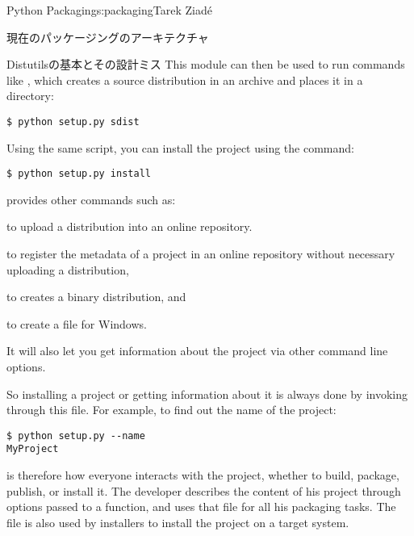 \begin{aosachapter}{Python Packaging}{s:packaging}{Tarek Ziad\'{e}}
\begin{aosasect1}{現在のパッケージングのアーキテクチャ}
\begin{aosasect2}{Distutilsの基本とその設計ミス}
\noindent This module can then be used to run  commands like
, which creates a source distribution in an archive and
places it in a  directory:

\begin{verbatim}
$ python setup.py sdist
\end{verbatim}

\noindent Using the same script, you can install the project using the
 command:

\begin{verbatim}
$ python setup.py install
\end{verbatim}

 provides other commands such as:

\begin{aosaitemize}

  \item {} to upload a distribution into an online repository.

  \item {} to register the metadata of a project in an online
  repository without necessary uploading a distribution,

  \item {} to creates a binary distribution, and

  \item {} to create a  file for Windows.

\end{aosaitemize}

\noindent
It will also let you get information about the project via other
command line options.

So installing a project or getting information about it is always done
by invoking  through this file. For example, to find
out the name of the project:

\begin{verbatim}
$ python setup.py --name
MyProject
\end{verbatim}

\noindent {} is therefore how everyone interacts with the project,
whether to build, package, publish, or install it. The developer
describes the content of his project through options passed to a
function, and uses that file for all his packaging tasks. The file is
also used by installers to install the project on a target system.



\end{aosasect2}
\end{aosasect1}
\end{aosachapter}
